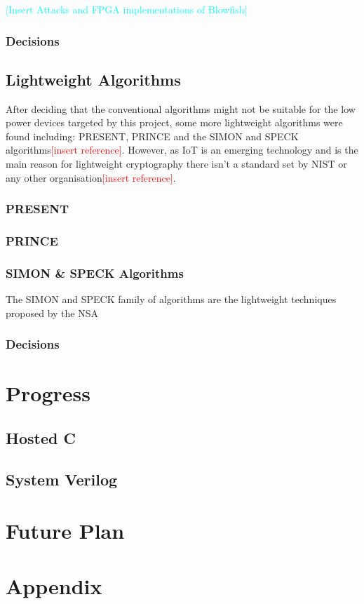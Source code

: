 \documentclass[12pt,twoside,a4paper]{report}
\begin{document}
    \textcolor{cyan}{[Insert Attacks and FPGA implementations of Blowfish]}
    
    \subsection{Decisions}
    
    \section{Lightweight Algorithms}
    After deciding that the conventional algorithms might not be suitable for the low power devices targeted by this project, some more lightweight algorithms were found including: PRESENT, PRINCE and the SIMON and SPECK algorithms\textcolor{red}{[insert reference]}. However, as IoT is an emerging technology and is the main reason for lightweight cryptography there isn't a standard set by NIST or any other organisation\textcolor{red}{[insert reference]}.
    
    \subsection{PRESENT}
    
    \subsection{PRINCE}
    
    \subsection{SIMON \& SPECK Algorithms}
    The SIMON and SPECK family of algorithms are the lightweight techniques proposed by the NSA
    
    \subsection{Decisions}
    
    \chapter{Progress}
    
    \section{Hosted C}
    
    \section{System Verilog}
    
    \chapter{Future Plan}
    
    \begin{thebibliography}{0}
    
    \end{thebibliography}
    
    \chapter*{Appendix}
     
\end{document}
